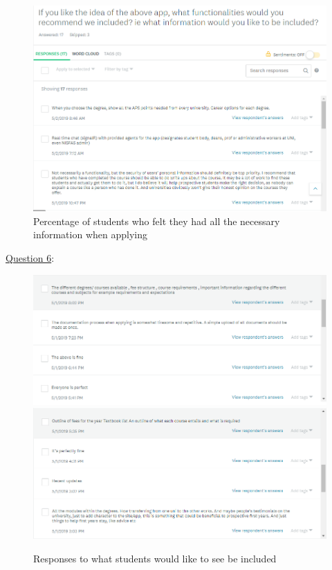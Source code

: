 \documentclass[a4paper, 12pt]{article}
\begin{document}
\begin{figure}[h]
\centering
\includegraphics[scale=0.6]{Q5}
\caption{Percentage of students who felt they had all the necessary information when applying}
\label{fig:4}
\end{figure}

\newpage
\underline{Question 6}:

\begin{figure}[h]
\centering
\includegraphics[width=\linewidth]{Q6}
\includegraphics[width=\linewidth]{Q6_2}
\caption{Responses to what students would like to see be included}
\label{fig:5}
\end{figure}
\end{document}
